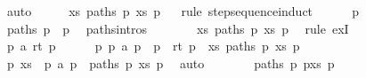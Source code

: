 \begin{isabellebody}
\ auto\isanewline
\ \ \isamarkupfalse%
\ \isamarkupfalse%
\ {\isachardoublequoteopen}{\isasymexists}xs{\isachardot}{\kern0pt}\ paths\ p\ xs\ p{\isacharprime}{\kern0pt}{\isachardoublequoteclose}\isanewline
\ \ \isamarkupfalse%
{\isacharparenleft}{\kern0pt}rule\ step{\isacharunderscore}{\kern0pt}sequence{\isachardot}{\kern0pt}induct{\isacharparenright}{\kern0pt}\isanewline
\ \ \ \ \isamarkupfalse%
\ p\isanewline
\ \ \ \ \isamarkupfalse%
\ {\isachardoublequoteopen}paths\ p\ {\isacharbrackleft}{\kern0pt}{\isacharbrackright}{\kern0pt}\ p{\isachardoublequoteclose}\ \isamarkupfalse%
\ paths{\isachardot}{\kern0pt}intros{\isacharparenleft}{\kern0pt}{}{\isacharparenright}{\kern0pt}\isacommand{{\isachardot}{\kern0pt}}\isamarkupfalse%
\isanewline
\ \ \ \ \isamarkupfalse%
\ \isamarkupfalse%
\ {\isachardoublequoteopen}{\isasymexists}xs{\isachardot}{\kern0pt}\ paths\ p\ xs\ p{\isachardoublequoteclose}\ \isamarkupfalse%
\ {\isacharparenleft}{\kern0pt}rule\ exI{\isacharparenright}{\kern0pt}\isanewline
\ \ \isamarkupfalse%
\isanewline
\ \ \ \ \isamarkupfalse%
\ p\ a\ rt\ p{\isacharprime}{\kern0pt}{\isacharprime}{\kern0pt}\isanewline
\ \ \ \ \isamarkupfalse%
\ {\isachardoublequoteopen}{\isasymexists}p{\isacharprime}{\kern0pt}{\isachardot}{\kern0pt}\ p\ {\isasymmapsto}a\ p{\isacharprime}{\kern0pt}\ {\isasymand}\ p{\isacharprime}{\kern0pt}\ {\isasymmapsto}{\isachardollar}{\kern0pt}\ rt\ p{\isacharprime}{\kern0pt}{\isacharprime}{\kern0pt}\ {\isasymand}\ {\isacharparenleft}{\kern0pt}{\isasymexists}xs{\isachardot}{\kern0pt}\ paths\ p{\isacharprime}{\kern0pt}\ xs\ p{\isacharprime}{\kern0pt}{\isacharprime}{\kern0pt}{\isacharparenright}{\kern0pt}{\isachardoublequoteclose}\isanewline
\ \ \ \ \isamarkupfalse%
\ \isamarkupfalse%
\ p{\isacharprime}{\kern0pt}\ xs\ \ {\isachardoublequoteopen}p\ {\isasymmapsto}a\ p{\isacharprime}{\kern0pt}{\isachardoublequoteclose}\ \ {\isachardoublequoteopen}paths\ p{\isacharprime}{\kern0pt}\ xs\ p{\isacharprime}{\kern0pt}{\isacharprime}{\kern0pt}{\isachardoublequoteclose}\ \isamarkupfalse%
\ auto\isanewline
\ \ \ \ \isamarkupfalse%
\ \isamarkupfalse%
\ {\isachardoublequoteopen}paths\ p\ {\isacharparenleft}{\kern0pt}p{\isacharprime}{\kern0pt}{\isacharhash}{\kern0pt}xs{\isacharparenright}{\kern0pt}\ p{\isacharprime}{\kern0pt}{\isacharprime}{\kern0pt}{\isachardoublequoteclose}\ \isamarkupfalse%

\end{isabellebody}
